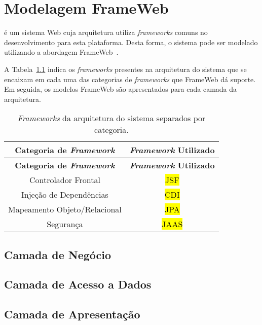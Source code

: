 
\chapter{Modelagem FrameWeb}
\label{sec-frameweb}
\vspace{-1cm}

\emph{\imprimirtitulo} é um sistema Web cuja arquitetura utiliza \textit{frameworks} comuns no desenvolvimento para esta plataforma. Desta forma, o sistema pode ser modelado utilizando a abordagem FrameWeb~\cite{souza-celebratingfalbo20}.

A Tabela~\ref{tabela-frameworks} indica os \textit{frameworks} presentes na arquitetura do sistema que se encaixam em cada uma das categorias de \textit{frameworks} que FrameWeb dá suporte. Em seguida, os modelos FrameWeb são apresentados para cada camada da arquitetura.

\begin{footnotesize}
	\begin{longtable}{|c|c|}
		\caption{\textit{Frameworks} da arquitetura do sistema separados por categoria.}
		\label{tabela-frameworks}\\\hline
		
		\rowcolor{lightgray}
		\textbf{Categoria de \textit{Framework}} & \textbf{\textit{Framework} Utilizado} \\\hline 
		\endfirsthead
		\hline
		\rowcolor{lightgray}
		\textbf{Categoria de \textit{Framework}} & \textbf{\textit{Framework} Utilizado} \\\hline 
		\endhead

		Controlador Frontal & \hl{JSF} \\\hline

		Injeção de Dependências & \hl{CDI} \\\hline

		Mapeamento Objeto/Relacional & \hl{JPA} \\\hline

		Segurança & \hl{JAAS} \\\hline
	\end{longtable}
\end{footnotesize}




\section{Camada de Negócio}
\label{sec-frameweb-negocio}





\section{Camada de Acesso a Dados}
\label{sec-frameweb-dados}




\section{Camada de Apresentação}
\label{sec-frameweb-apresentacao}



